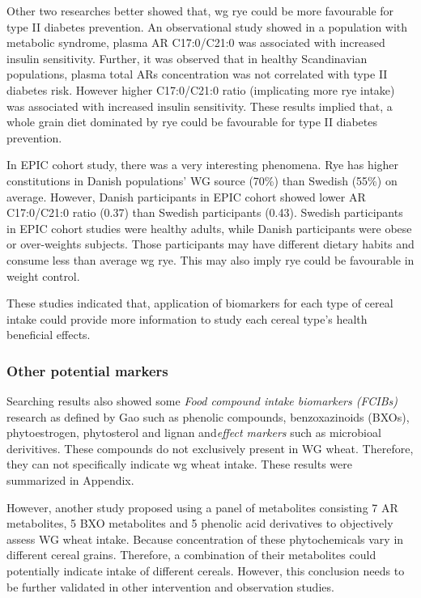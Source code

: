 Other two researches better showed that, \acrshort{wg} rye could be more favourable for type II diabetes prevention. An observational study showed in a population with metabolic syndrome, plasma AR C17:0/C21:0 was associated with increased insulin sensitivity\cite{ISI:000333777700008}. 
Further, it was observed that in healthy Scandinavian populations, plasma total ARs concentration was not correlated with type II diabetes risk. However higher C17:0/C21:0 ratio (implicating more rye intake) was associated with increased insulin sensitivity\cite{ISI:000378977200013}. These results implied that, a whole grain diet dominated by rye could be favourable for type II diabetes prevention. 

In EPIC cohort study\cite{ISI:000334172400017}, there was a very interesting phenomena. Rye has higher constitutions in Danish populations' WG source (70\%) than Swedish (55\%) on average. 
However, Danish participants in EPIC cohort showed lower AR C17:0/C21:0 ratio (0.37) than Swedish participants (0.43). 
Swedish participants in EPIC cohort studies were healthy adults, while Danish participants were obese or over-weights subjects. Those participants may have different dietary habits and consume less than average wg rye. This may also imply rye could be favourable in weight control.

These studies indicated that, application of biomarkers for each type of cereal intake could provide more information to study each cereal type's health beneficial effects.

\subsubsection{Other potential markers}
Searching results also showed some \textit{Food compound intake biomarkers (FCIBs)} research as defined by Gao\cite{Gao2017} such as phenolic compounds\cite{ISI:000389134200003}, benzoxazinoids (BXOs)\cite{ISI:000394168100034,ISI:000348343300015}, phytoestrogen\cite{ISI:000384082300001}, phytosterol and lignan\cite{ISI:000387249200001} and\textit{effect markers} such as microbioal derivitives\cite{ISI:000348343300015}. These compounds do not exclusively present in WG wheat. Therefore, they can not specifically indicate \acrshort{wg} wheat intake. These results were summarized in Appendix.

However, another study\cite{ISI:000387249200001} proposed using a panel of  metabolites consisting 7 AR metabolites, 5 BXO metabolites and 5 phenolic acid derivatives to objectively assess WG wheat intake. Because concentration of these phytochemicals vary in different cereal grains. Therefore, a combination of their metabolites could potentially indicate intake of different cereals. However, this conclusion needs to be further validated in other intervention and observation studies.



